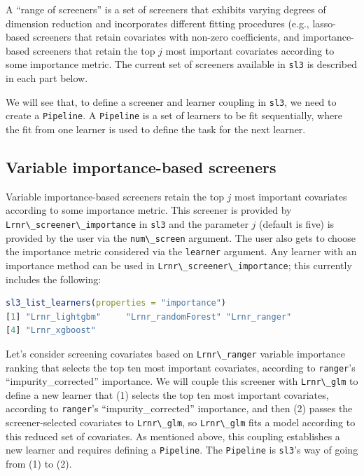 \documentclass[
  12pt, krantz2,
]{krantz}
\newcommand{\passthrough}[1]{#1}
\newcommand{\1}{\mathbbm{1}}
\theoremstyle{definition}
\theoremstyle{definition}
\theoremstyle{definition}
\theoremstyle{definition}
\theoremstyle{remark}
\begin{document}
A ``range of screeners'' is a set of screeners that exhibits varying
degrees of dimension reduction and incorporates different fitting procedures
(e.g., lasso-based screeners that retain covariates with non-zero
coefficients, and importance-based screeners that retain the top \(j\) most
important covariates according to some importance metric. The current set of
screeners available in \passthrough{\lstinline!sl3!} is described in each part below.

We will see that, to define a screener and learner coupling in \passthrough{\lstinline!sl3!},
we need to create a \passthrough{\lstinline!Pipeline!}. A \passthrough{\lstinline!Pipeline!} is a set of learners
to be fit sequentially, where the fit from one learner is used to define the
task for the next learner.

\hypertarget{variable-importance-based-screeners}{%
\subsection{Variable importance-based screeners}\label{variable-importance-based-screeners}}

Variable importance-based screeners retain the top \(j\) most important covariates
according to some importance metric. This screener is provided by
\passthrough{\lstinline!Lrnr\_screener\_importance!} in \passthrough{\lstinline!sl3!} and the parameter \(j\) (default is five) is
provided by the user via the \passthrough{\lstinline!num\_screen!} argument. The user also gets to
choose the importance metric considered via the \passthrough{\lstinline!learner!} argument. Any
learner with an importance method can be used in \passthrough{\lstinline!Lrnr\_screener\_importance!};
this currently includes the following:

\begin{lstlisting}[language=R]
sl3_list_learners(properties = "importance")
[1] "Lrnr_lightgbm"     "Lrnr_randomForest" "Lrnr_ranger"      
[4] "Lrnr_xgboost"     
\end{lstlisting}

Let's consider screening covariates based on \passthrough{\lstinline!Lrnr\_ranger!} variable importance
ranking that selects the top ten most important covariates, according to
\passthrough{\lstinline!ranger!}'s ``impurity\_corrected'' importance. We will couple this screener with
\passthrough{\lstinline!Lrnr\_glm!} to define a new learner that (1) selects the top ten most important
covariates, according to \passthrough{\lstinline!ranger!}'s ``impurity\_corrected'' importance, and then
(2) passes the screener-selected covariates to \passthrough{\lstinline!Lrnr\_glm!}, so \passthrough{\lstinline!Lrnr\_glm!}
fits a model according to this reduced set of covariates. As mentioned above,
this coupling establishes a new learner and requires defining a \passthrough{\lstinline!Pipeline!}.
The \passthrough{\lstinline!Pipeline!} is \passthrough{\lstinline!sl3!}'s way of going from (1) to (2).
\end{document}
